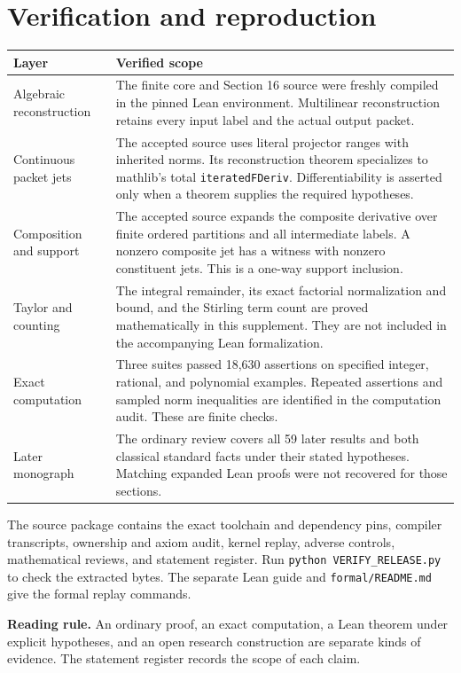 \documentclass[11pt]{article}
\theoremstyle{remark}\newtheorem{remark}[theorem]{Remark}
\begin{document}
\section{Verification and reproduction}
\begin{longtable}{@{}p{.28\linewidth}p{.64\linewidth}@{}}
\toprule
\textbf{Layer}&\textbf{Verified scope}\\\midrule\endhead
Algebraic reconstruction&The finite core and Section 16 source were freshly compiled in the pinned Lean environment. Multilinear reconstruction retains every input label and the actual output packet.\\
Continuous packet jets&The accepted source uses literal projector ranges with inherited norms. Its reconstruction theorem specializes to mathlib's total \texttt{iteratedFDeriv}. Differentiability is asserted only when a theorem supplies the required hypotheses.\\
Composition and support&The accepted source expands the composite derivative over finite ordered partitions and all intermediate labels. A nonzero composite jet has a witness with nonzero constituent jets. This is a one-way support inclusion.\\
Taylor and counting&The integral remainder, its exact factorial normalization and bound, and the Stirling term count are proved mathematically in this supplement. They are not included in the accompanying Lean formalization.\\
Exact computation&Three suites passed 18,630 assertions on specified integer, rational, and polynomial examples. Repeated assertions and sampled norm inequalities are identified in the computation audit. These are finite checks.\\
Later monograph&The ordinary review covers all 59 later results and both classical standard facts under their stated hypotheses. Matching expanded Lean proofs were not recovered for those sections.\\
\bottomrule
\end{longtable}

The source package contains the exact toolchain and dependency pins, compiler transcripts, ownership and axiom audit, kernel replay, adverse controls, mathematical reviews, and statement register. Run \texttt{python VERIFY\_RELEASE.py} to check the extracted bytes. The separate Lean guide and \texttt{formal/README.md} give the formal replay commands.

\noindent\textbf{Reading rule.} An ordinary proof, an exact computation, a Lean theorem under explicit hypotheses, and an open research construction are separate kinds of evidence. The statement register records the scope of each claim.
\end{document}
